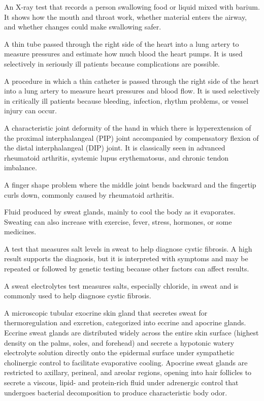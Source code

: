  An X-ray test that records a person swallowing food or liquid mixed with barium. It shows how the mouth and throat work, whether material enters the airway, and whether changes could make swallowing safer.

 A thin tube passed through the right side of the heart into a lung artery to measure pressures and estimate how much blood the heart pumps. It is used selectively in seriously ill patients because complications are possible.

 A procedure in which a thin catheter is passed through the right side of the heart into a lung artery to measure heart pressures and blood flow. It is used selectively in critically ill patients because bleeding, infection, rhythm problems, or vessel injury can occur.

 A characteristic joint deformity of the hand in which there is hyperextension of the proximal interphalangeal (PIP) joint accompanied by compensatory flexion of the distal interphalangeal (DIP) joint. It is classically seen in advanced rheumatoid arthritis, systemic lupus erythematosus, and chronic tendon imbalance.

 A finger shape problem where the middle joint bends backward and the fingertip curls down, commonly caused by rheumatoid arthritis.

 Fluid produced by sweat glands, mainly to cool the body as it evaporates. Sweating can also increase with exercise, fever, stress, hormones, or some medicines.

 A test that measures salt levels in sweat to help diagnose cystic fibrosis. A high result supports the diagnosis, but it is interpreted with symptoms and may be repeated or followed by genetic testing because other factors can affect results.

 A sweat electrolytes test measures salts, especially chloride, in sweat and is commonly used to help diagnose cystic fibrosis.

 A microscopic tubular exocrine skin gland that secretes sweat for thermoregulation and excretion, categorized into eccrine and apocrine glands. Eccrine sweat glands are distributed widely across the entire skin surface (highest density on the palms, soles, and forehead) and secrete a hypotonic watery electrolyte solution directly onto the epidermal surface under sympathetic cholinergic control to facilitate evaporative cooling. Apocrine sweat glands are restricted to axillary, perineal, and areolar regions, opening into hair follicles to secrete a viscous, lipid- and protein-rich fluid under adrenergic control that undergoes bacterial decomposition to produce characteristic body odor.

